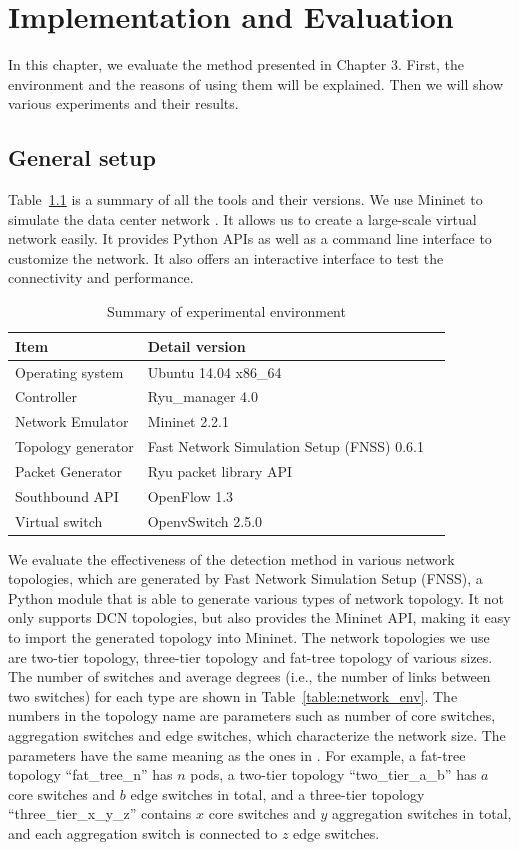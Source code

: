 \chapter{Implementation and Evaluation}
\label{Implementation_and_Evaluation}
In this chapter, we evaluate the method presented in Chapter 3. First, the environment and the reasons of using them will be explained. Then we will show various experiments and their results.

\section{General setup}
Table~\ref{table:Experiment_table} is a summary of all the tools and their versions. We use Mininet to simulate the data center network \cite{Mininet}. It allows us to create a large-scale virtual network easily. It provides Python APIs as well as a command line interface to customize the network. It also offers an interactive interface to test the connectivity and performance.

\begin{table}[H]
\centering
\caption{Summary of experimental environment}
\begin{tabular}{|l|p{4cm}|p{4.5cm}}
\hline Item & Detail version \\
\hline
\hline Operating system & Ubuntu 14.04 x86\_64 \\
\hline Controller & Ryu\_manager 4.0 \\
\hline Network Emulator & Mininet 2.2.1 \\
\hline Topology generator & Fast Network Simulation Setup (FNSS) 0.6.1\\
\hline Packet Generator & Ryu packet library API \\
\hline Southbound API & OpenFlow 1.3 \\
\hline Virtual switch & OpenvSwitch 2.5.0 \\
\hline 
\end{tabular}
\label{table:Experiment_table}
\end{table}

We evaluate the effectiveness of the detection method in various network topologies, which are generated by Fast Network Simulation Setup (FNSS), a Python module that is able to generate various types of network topology. It not only supports DCN topologies, but also provides the Mininet API, making it easy to import the generated topology into Mininet. The network topologies we use are two-tier topology, three-tier topology and fat-tree topology of various sizes. The number of switches and average degrees (i.e., the number of links between two switches) for each type are shown in Table~\ref{table:network_env}. The numbers in the topology name are parameters such as number of core switches, aggregation switches and edge switches, which characterize the network size. The parameters have the same meaning as the ones in \cite{FNSS}. For example, a fat-tree topology ``fat\_tree\_n'' has $n$ pods, a two-tier topology ``two\_tier\_a\_b'' has $a$ core switches and $b$ edge switches in total, and a three-tier topology ``three\_tier\_x\_y\_z'' contains $x$ core switches and $y$ aggregation switches in total, and each aggregation switch is connected to $z$ edge switches. 

